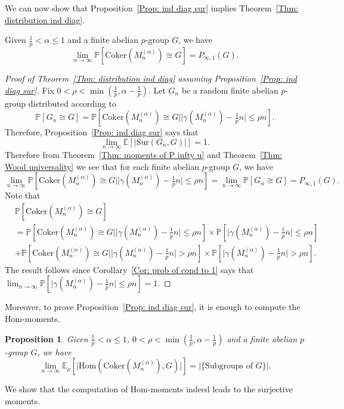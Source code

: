 \documentclass[12pt]{amsart}
\newtheorem{proposition}[theorem]{Proposition}
\theoremstyle{definition}
\newcommand{\PPP}{\mathbb{P}}
\newcommand{\PPb}[1]{\PPP\left[#1\right]}
\newcommand{\Mna}{M_{n}^{(\alpha)}}
\newcommand{\Erho}{\E_{\rho}}
\newcommand{\abs}[1]{\vert#1\vert}
\newcommand{\E}{\mathbb{E}}
\newcommand{\Coker}{\text{Coker}}
\newcommand{\Hom}{\text{Hom}}
\newcommand{\Sur}{\text{Sur}}
\newenvironment{customthm}[1]
  {\renewcommand\theinnercustomthm{#1}\innercustomthm}
  {\endinnercustomthm}
\begin{document}
We can now show that Proposition~\ref{Prop: ind diag sur} implies Theorem~\ref{Thm: distribution ind diag}.

\begin{customthm}{\ref{Thm: distribution ind diag}}
Given $\frac{1}{p}<\alpha\leq 1$ and a finite abelian $p$-group $G$, we have
\[
\lim_{n\to\infty}
\PPb{\Coker(\Mna)\cong G}
=P_{\infty,1}(G).
\]    
\end{customthm}
\begin{proof}[Proof of Theorem~\ref{Thm: distribution ind diag} assuming Proposition~\ref{Prop: ind diag sur}]
Fix $0<\rho<\min(\frac{1}{p},\alpha-\frac{1}{p})$.
Let $G_n$ be a random finite abelian $p$-group distributed according to
\[
\PPb{G_n\cong G}
= \PPb{ \Coker(\Mna)\cong G \mid \abs{\gamma(\Mna)-\tfrac{1}{p} n}\leq \rho n}.
\]
Therefore, Proposition~\ref{Prop: ind diag sur} says that
\[
\lim_{n\to\infty} \E[\abs{\Sur(G_n,G)}] =1.
\]
Therefore from Theorem~\ref{Thm: moments of P infty u} and Theorem~\ref{Thm: Wood universality} we see that for each finite abelian $p$-group $G$, we have
\[
\lim_{n\to\infty} \PPb{ \Coker(\Mna)\cong G \mid \abs{\gamma(\Mna)-\tfrac{1}{p} n} \leq \rho n}
=\lim_{n\to\infty} \PPP[G_n\cong G]
=P_{\infty,1}(G).
\]
Note that
\begin{align*}
&\PPP[\Coker(\Mna)\cong G]\\
&= \PPP[ \Coker(\Mna)\cong G \mid \abs{\gamma(\Mna)-\tfrac{1}{p} n}\leq \rho n]
\times \PPP[\abs{\gamma(\Mna)-\tfrac{1}{p} n}\leq \rho n]\\
&+\PPP[ \Coker(\Mna)\cong G \mid \abs{\gamma(\Mna)-\tfrac{1}{p} n}> \rho n]
\times \PPP[\abs{\gamma(\Mna)-\tfrac{1}{p} n}> \rho n].
\end{align*}
The result follows since Corollary~\ref{Cor: prob of cond to 1} says that $\lim_{n\to\infty} \PPP[\abs{\gamma(\Mna)-\tfrac{1}{p} n}\leq \rho n]=1$.
\end{proof}

Moreover, to prove Proposition~\ref{Prop: ind diag sur}, it is enough to compute the Hom-moments.

\begin{proposition}\label{Prop: ind diag hom}
Given $\frac{1}{p}<\alpha\leq 1$, $0<\rho<\min(\frac{1}{p},\alpha-\frac{1}{p})$  and a finite abelian $p$-group $G$, we have
\[
\lim_{n\to\infty}
\Erho[\abs{\Hom(\Coker(\Mna),G)}] =\abs{\{\text{Subgroups of }G\}}.
\]
\end{proposition}

We show that the computation of Hom-moments indeed leads to the surjective moments.
\end{document}
